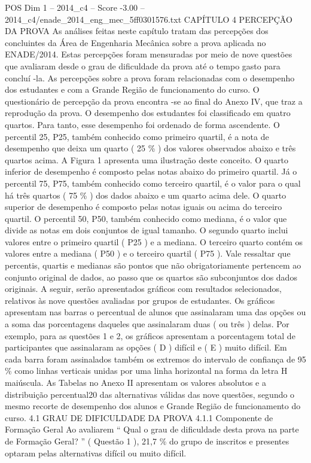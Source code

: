 \begin{textsample}{POS Dim 1 – 2014\_c4 – Score -3.00 – 2014\_c4/enade\_2014\_eng\_mec\_5ff0301576.txt}  \label{ex:f1_pos_315}
CAPÍTULO 4 PERCEPÇÃO DA PROVA As análises feitas neste capítulo tratam das percepções dos concluintes da Área de Engenharia Mecânica sobre a prova aplicada no ENADE/2014.
Estas percepções foram mensuradas por meio de nove questões que avaliaram desde o grau de dificuldade da prova até o tempo gasto para concluí -la.
As percepções sobre a prova foram relacionadas com o desempenho dos estudantes e com a Grande Região de funcionamento do curso.
O questionário de percepção da prova encontra -se ao final do Anexo IV, que traz a reprodução da prova.
O desempenho dos estudantes foi classificado em quatro quartos.
Para tanto, esse desempenho foi ordenado de forma ascendente.
O percentil 25, P25, também conhecido como primeiro quartil, é a nota de desempenho que deixa um quarto ( 25 \% ) dos valores observados abaixo e três quartos acima.
A Figura 1 apresenta uma ilustração deste conceito.
O quarto inferior de desempenho é composto pelas notas abaixo do primeiro quartil.
Já o percentil 75, P75, também conhecido como terceiro quartil, é o valor para o qual há três quartos ( 75 \% ) dos dados abaixo e um quarto acima dele.
O quarto superior de desempenho é composto pelas notas iguais ou acima do terceiro quartil.
O percentil 50, P50, também conhecido como mediana, é o valor que divide as notas em dois conjuntos de igual tamanho.
O segundo quarto inclui valores entre o primeiro quartil ( P25 ) e a mediana.
O terceiro quarto contém os valores entre a mediana ( P50 ) e o terceiro quartil ( P75 ).
Vale ressaltar que percentis, quartis e medianas são pontos que não obrigatoriamente pertencem ao conjunto original de dados, ao passo que os quartos são subconjuntos dos dados originais.
A seguir, serão apresentados gráficos com resultados selecionados, relativos às nove questões avaliadas por grupos de estudantes.
Os gráficos apresentam nas barras o percentual de alunos que assinalaram uma das opções ou a soma das porcentagens daqueles que assinalaram duas ( ou três ) delas.
Por exemplo, para as questões 1 e 2, os gráficos apresentam a porcentagem total de participantes que assinalaram as opções ( D ) difícil e ( E ) muito difícil.
Em cada barra foram assinalados também os extremos do intervalo de confiança de 95 \% como linhas verticais unidas por uma linha horizontal na forma da letra H maiúscula.
As Tabelas no Anexo II apresentam os valores absolutos e a distribuição percentual20 das alternativas válidas das nove questões, segundo o mesmo recorte de desempenho dos alunos e Grande Região de funcionamento do curso. 4.1 GRAU DE DIFICULDADE DA PROVA 4.1.1 Componente de Formação Geral Ao avaliarem “ Qual o grau de dificuldade desta prova na parte de Formação Geral? ” ( Questão 1 ), 21,7 \% do grupo de inscritos e presentes optaram pelas alternativas difícil ou muito difícil.

\end{textsample}
